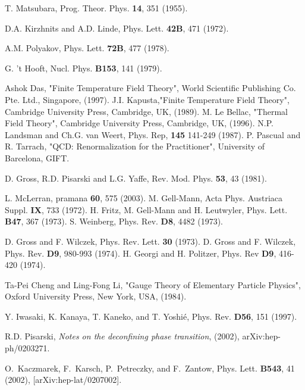 \begin{thebibliography}{10}

T. Matsubara, Prog. Theor. Phys. {\bf 14}, 351 (1955).

D.A. Kirzhnits and A.D. Linde, Phys. Lett. {\bf 42B}, 471 (1972).

A.M. Polyakov, Phys. Lett. {\bf 72B}, 477 (1978).

G. 't Hooft, Nucl. Phys. {\bf B153}, 141 (1979).

Ashok Das, "Finite Temperature Field Theory", World Scientific Publishing Co. Pte. Ltd., Singapore, (1997). 
J.I. Kapusta,"Finite Temperature Field Theory", Cambridge University Press, Cambridge, UK, (1989). 
M. Le Bellac, "Thermal Field Theory", Cambridge University Press, Cambridge, UK, (1996).
N.P. Landsman and Ch.G. van Weert, Phys. Rep, {\bf 145} 141-249 (1987).
P. Pascual and R. Tarrach, "QCD: Renormalization for the Practitioner", University of Barcelona, GIFT.

D. Gross, R.D. Pisarski and L.G. Yaffe, Rev. Mod. Phys. {\bf 53}, 43 (1981).

L. McLerran, pramana {\bf 60}, 575 (2003). 
M. Gell-Mann, Acta Phys. Austriaca Suppl. {\bf IX}, 733 (1972).
H. Fritz, M. Gell-Mann and H. Leutwyler, Phys. Lett. {\bf B47}, 367 (1973).
S. Weinberg, Phys. Rev. {\bf D8}, 4482 (1973).

D. Gross and F. Wilczek, Phys. Rev. Lett. {\bf 30} (1973). 
D. Gross and F. Wilczek, Phys. Rev. {\bf D9}, 980-993 (1974).
H. Georgi and H. Politzer, Phys. Rev {\bf D9}, 416-420 (1974).

Ta-Pei Cheng and Ling-Fong Li, "Gauge Theory of Elementary Particle Physics", Oxford University Press, New York, USA, (1984). 

Y. Iwasaki, K. Kanaya, T. Kaneko, and T. Yoshi\'e, Phys. Rev. {\bf D56}, 151 (1997). 

R.D. Pisarski, {\it Notes on the deconfining phase transition}, (2002), arXiv:hep-ph/0203271.

O.~Kaczmarek, F.~Karsch, P.~Petreczky, and F.~Zantow,
\newblock Phys. Lett. {\bf B543}, 41 (2002), [arXiv:hep-lat/0207002].


\end{thebibliography}
